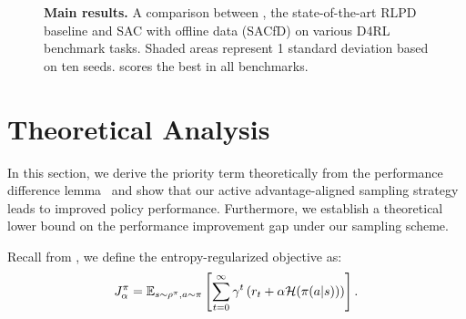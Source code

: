 \begin{figure*}[t!]
    

    
    \caption{\textbf{Main results.} A comparison between \algname, the state-of-the-art RLPD baseline and SAC with offline data (SACfD) on various D4RL benchmark tasks. %
    Shaded areas represent 1 standard deviation based on ten seeds. \algname scores the best in all benchmarks. 
    }\label{fig:exp:main}
        \vspace{-3mm}
\end{figure*}


\section{Theoretical Analysis}\label{sec:theoretical-analysis}





In this section, we derive the priority term theoretically from the performance difference lemma~\citep{kakade2002approximately} and show that our active advantage-aligned sampling strategy leads to improved policy performance. Furthermore, we establish a theoretical lower bound on the performance improvement gap under our sampling scheme.  

Recall from , we define the entropy-regularized objective as:
\begin{equation*}
    J_\alpha^\pi = \mathbb{E}_{s\sim\rho^{\pi},a\sim\pi} \left[\sum_{t=0}^{\infty} \gamma^t \left(r_t+\alpha \mathcal{H}(\pi(a|s))\right) \right].
\end{equation*}






